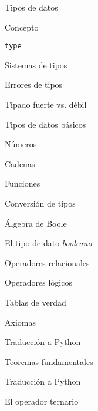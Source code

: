 \begin{longenum}
\begin{longenum}
\begin{longenum}
\begin{longenum}
            \end{longenum}
        \end{longenum}
        \item Tipos de datos
        \begin{longenum}
            \item Concepto
            \item \texttt{type}
            \item Sistemas de tipos
            \begin{longenum}
                \item Errores de tipos
                \item Tipado fuerte vs. débil
            \end{longenum}
            \item Tipos de datos básicos
            \begin{longenum}
                \item Números
                \item Cadenas
                \item Funciones
            \end{longenum}
            \item Conversión de tipos
        \end{longenum}
        \item Álgebra de Boole
        \begin{longenum}
            \item El tipo de dato \textit{booleano}
            \item Operadores relacionales
            \item Operadores lógicos
            \begin{longenum}
                \item Tablas de verdad
            \end{longenum}
            \item Axiomas
            \begin{longenum}
                \item Traducción a Python
            \end{longenum}
            \item Teoremas fundamentales
            \begin{longenum}
                \item Traducción a Python
            \end{longenum}
            \item El operador ternario

\end{longenum}
\end{longenum}
\end{longenum}
